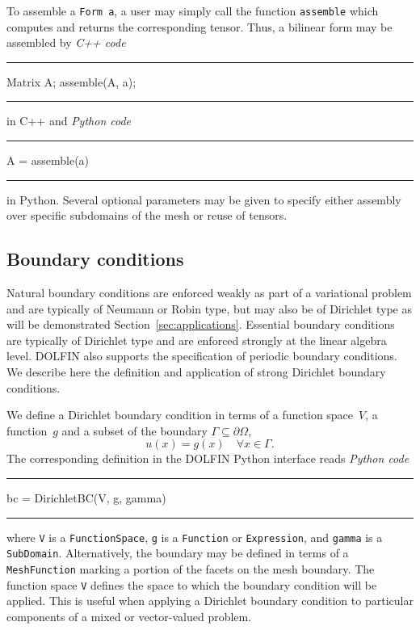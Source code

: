 \documentclass[acmtoms]{acmtrans2m}
\newenvironment{pythoncode}[1]{\center\minipage{#1\textwidth}\footnotesize\hfill\it Python code \rm\vspace{0.1cm}\hrule\renewcommand{\baselinestretch}{0.9}\footnotesize\verbatim}{\endverbatim\hrule\normalsize\endminipage\newline\endcenter}
\newenvironment{cppcode}[1]{\center\minipage{#1\textwidth}\footnotesize\hfill\it C++ code \rm\vspace{0.1cm}\hrule\renewcommand{\baselinestretch}{0.9}\footnotesize\verbatim}{\endverbatim\hrule\normalsize\endminipage\newline\endcenter}
\newcommand{\emp}[1]{\texttt{#1}}
\newcommand{\dolfin}{DOLFIN}
\begin{document}
To assemble a \emp{Form~a}, a user may simply call the function
\emp{assemble} which computes and returns the corresponding tensor.
Thus, a bilinear form may be assembled by
\begin{cppcode}{0.9}
  Matrix A;
  assemble(A, a);
\end{cppcode}
in C++ and
\begin{pythoncode}{0.9}
  A = assemble(a)
\end{pythoncode}
in Python. Several optional parameters may be given to specify either
assembly over specific subdomains of the mesh or reuse of tensors.

\subsection{Boundary conditions}

Natural boundary conditions are enforced weakly as part of
a variational problem and are typically of Neumann or Robin type, but
may also be of Dirichlet type as will be demonstrated
Section~\ref{sec:applications}. Essential boundary conditions are
typically of Dirichlet type and are enforced strongly at the linear
algebra level. \dolfin{} also supports the specification of periodic
boundary conditions. We describe here the definition and application
of strong Dirichlet boundary conditions.

We define a Dirichlet boundary condition in terms of a function
space~$V$, a function~$g$ and a subset of the boundary $\Gamma
\subseteq \partial\Omega$,
\begin{equation}
  u(x) = g(x) \quad \forall x \in \Gamma.
\end{equation}
The corresponding definition in the \dolfin{} Python interface reads
\begin{pythoncode}{0.9}
bc = DirichletBC(V, g, gamma)
\end{pythoncode}
where \emp{V} is a \emp{FunctionSpace}, \emp{g} is a \emp{Function} or
\emp{Expression}, and \emp{gamma} is a
\emp{SubDomain}. Alternatively, the boundary may be defined in terms
of a \emp{MeshFunction} marking a portion of the facets on the mesh
boundary.  The function space \emp{V} defines the space to which the
boundary condition will be applied. This is useful when applying a
Dirichlet boundary condition to particular components of a mixed or
vector-valued problem.
\end{document}
